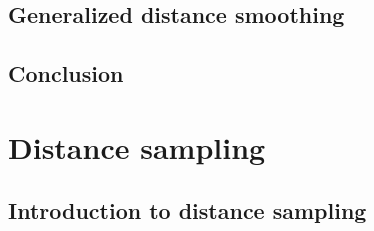 \documentclass[12pt]{report}
\begin{document}


\chapter{Generalized distance smoothing}
%



\chapter{Conclusion}


\part{Distance sampling}

\chapter{Introduction to distance sampling}

\end{document}
